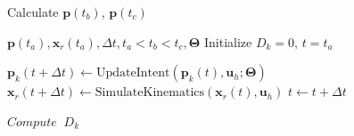 \begin{algorithm}[t]
	\caption{Calculate $\boldsymbol{p}(t_b)$, $\boldsymbol{p}(t_c)$}
	\label{alg1}
	\begin{algorithmic}[1]
		\REQUIRE $\boldsymbol{p}(t_a), \boldsymbol{x}_r(t_a), \Delta t, t_a < t_b < t_c, \boldsymbol{\Theta}$
		\STATE Initialize $D_k = 0$, $t = t_a$
		
			\STATE $\boldsymbol{p}_k(t + \Delta t) \leftarrow \text{UpdateIntent}(\boldsymbol{p}_k(t), \boldsymbol{u}_h; \boldsymbol{\Theta})$
			\STATE $\boldsymbol{x}_r(t + \Delta t) \leftarrow \text{SimulateKinematics}(\boldsymbol{x}_r(t), \boldsymbol{u}_h)$
			  
			\ENDIF
			  \ENDIF
			\STATE $t \leftarrow t + \Delta t$
		\ENDWHILE
	
%		
		
		\STATE $Compute \;\;D_k$
		\ENDFOR
		
	\end{algorithmic}
\end{algorithm}

